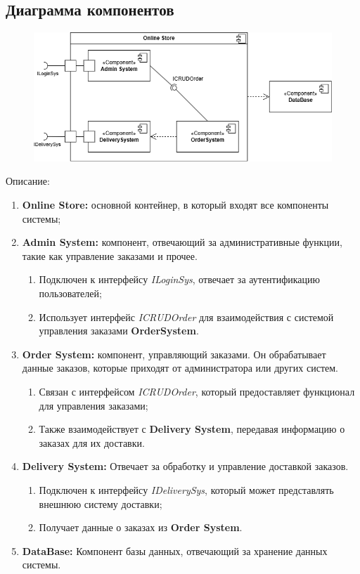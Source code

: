 \documentclass[a4paper]{report}
\begin{document}
\subsection{Диаграмма компонентов}
\begin{figure}[H]
    \centering
    \includegraphics[width=\textwidth]{Диаграмма компонентов.png}
\end{figure}
Описание:
\begin{enumerate}
    \item \textbf{Online Store:} основной контейнер, в который входят все компоненты системы;
    \item \textbf{Admin System:} компонент, отвечающий за административные функции, такие как управление заказами и прочее. \begin{enumerate}
        \item Подключен к интерфейсу \textit{ILoginSys}, отвечает за аутентификацию пользователей;
        \item Использует интерфейс \textit{ICRUDOrder} для взаимодействия с системой управления заказами \textbf{OrderSystem}.
    \end{enumerate}
    \item \textbf{Order System:} компонент, управляющий заказами. Он обрабатывает данные заказов, которые приходят от администратора или других систем. \begin{enumerate}
        \item Связан с интерфейсом \textit{ICRUDOrder}, который предоставляет функционал для управления заказами;
        \item Также взаимодействует с \textbf{Delivery System}, передавая информацию о заказах для их доставки.
    \end{enumerate}
    \item \textbf{Delivery System:} Отвечает за обработку и управление доставкой заказов. \begin{enumerate}
        \item Подключен к интерфейсу \textit{IDeliverySys}, который может представлять внешнюю систему доставки;
        \item Получает данные о заказах из \textbf{Order System}.
    \end{enumerate}
    \item \textbf{DataBase:} Компонент базы данных, отвечающий за хранение данных системы.
\end{enumerate}
\end{document}
